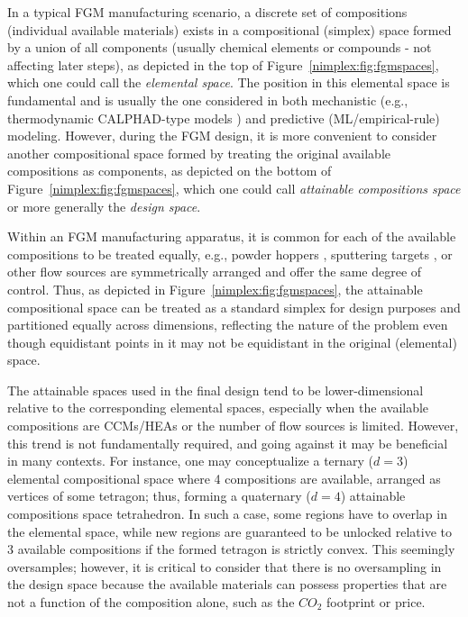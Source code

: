 In a typical FGM manufacturing scenario, a discrete set of compositions (individual available materials) exists in a compositional (simplex) space formed by a union of all components (usually chemical elements or compounds - not affecting later steps), as depicted in the top of Figure~\ref{nimplex:fig:fgmspaces}, which one could call the \emph{elemental space}. The position in this elemental space is fundamental and is usually the one considered in both mechanistic (e.g., thermodynamic CALPHAD-type models \cite{Olson2023GenomicDynamics}) and predictive (ML/empirical-rule) modeling. However, during the FGM design, it is more convenient to consider another compositional space formed by treating the original available compositions as components, as depicted on the bottom of Figure~\ref{nimplex:fig:fgmspaces}, which one could call \emph{attainable compositions space} or more generally the \emph{design space}.


Within an FGM manufacturing apparatus, it is common for each of the available compositions to be treated equally, e.g., powder hoppers \cite{Reichardt2021AdvancesMaterials}, sputtering targets \cite{Wu2023ATechnology}, or other flow sources are symmetrically arranged and offer the same degree of control. Thus, as depicted in Figure~\ref{nimplex:fig:fgmspaces}, the attainable compositional space can be treated as a standard simplex for design purposes and partitioned equally across dimensions, reflecting the nature of the problem even though equidistant points in it may not be equidistant in the original (elemental) space.

The attainable spaces used in the final design tend to be lower-dimensional relative to the corresponding elemental spaces, especially when the available compositions are CCMs/HEAs or the number of flow sources is limited. However, this trend is not fundamentally required, and going against it may be beneficial in many contexts. For instance, one may conceptualize a ternary ($d=3$) elemental compositional space where 4 compositions are available, arranged as vertices of some tetragon; thus, forming a quaternary ($d=4$) attainable compositions space tetrahedron. In such a case, some regions have to overlap in the elemental space, while new regions are guaranteed to be unlocked relative to 3 available compositions if the formed tetragon is strictly convex. This seemingly oversamples; however, it is critical to consider that there is no oversampling in the design space because the available materials can possess properties that are not a function of the composition alone, such as the $CO_2$ footprint or price. 

